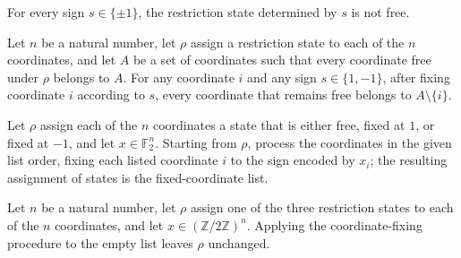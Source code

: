 \begin{theorem}
\label{FABL.CoordRestriction.fixedState_ne_free}
\leanok
{}
For every sign $s\in\{\pm1\}$, the restriction state determined by $s$ is not free.
\end{theorem}

\begin{theorem}
\label{FABL.CoordRestriction.freeWithin_fixCoordinate}
\leanok
{}
Let $n$ be a natural number, let $\rho$ assign a restriction state to each of the $n$
coordinates, and let $A$ be a set of coordinates such that every coordinate free under
$\rho$ belongs to $A$. For any coordinate $i$ and any sign $s\in\{1,-1\}$, after fixing
coordinate $i$ according to $s$, every coordinate that remains free belongs to
$A\setminus\{i\}$.
\end{theorem}

\begin{definition}
\label{FABL.CoordRestriction.fixCoordinateList}
\leanok
{}
Let $\rho$ assign each of the $n$ coordinates a state that is either free, fixed at $1$,
or fixed at $-1$, and let $x\in\mathbb{F}_2^n$. Starting from $\rho$, process the
coordinates in the given list order, fixing each listed coordinate $i$ to the sign
encoded by $x_i$; the resulting assignment of states is the fixed-coordinate list.
\end{definition}

\begin{theorem}
\label{FABL.CoordRestriction.fixCoordinateList_nil}
\leanok
{}
Let $n$ be a natural number, let $\rho$ assign one of the three restriction states to
each of the $n$ coordinates, and let $x\in(\mathbb{Z}/2\mathbb{Z})^n$. Applying the
coordinate-fixing procedure to the empty list leaves $\rho$ unchanged.
\end{theorem}


